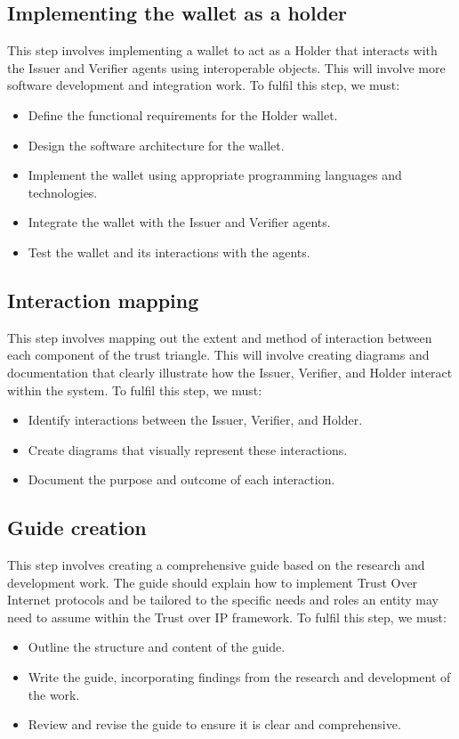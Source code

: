 \subsection{Implementing the wallet as a holder}
This step involves implementing a wallet to act as a Holder that interacts with the Issuer and Verifier agents using interoperable objects. This will involve more software development and integration work. To fulfil this step, we must:

\begin{itemize}
    \item Define the functional requirements for the Holder wallet.
    \item Design the software architecture for the wallet.
    \item Implement the wallet using appropriate programming languages and technologies.
    \item Integrate the wallet with the Issuer and Verifier agents.
    \item Test the wallet and its interactions with the agents.
\end{itemize}

\subsection{Interaction mapping}
This step involves mapping out the extent and method of interaction between each component of the trust triangle. This will involve creating diagrams and documentation that clearly illustrate how the Issuer, Verifier, and Holder interact within the system. To fulfil this step, we must:
\begin{itemize}
    \item Identify interactions between the Issuer, Verifier, and Holder.
    \item Create diagrams that visually represent these interactions.
    \item Document the purpose and outcome of each interaction.
\end{itemize}

\subsection{Guide creation}
This step involves creating a comprehensive guide based on the research and development work. The guide should explain how to implement Trust Over Internet protocols and be tailored to the specific needs and roles an entity may need to assume within the Trust over IP framework. To fulfil this step, we must:
\begin{itemize}
    \item Outline the structure and content of the guide.
    \item Write the guide, incorporating findings from the research and development of the work.
    \item Review and revise the guide to ensure it is clear and comprehensive.
\end{itemize} 




